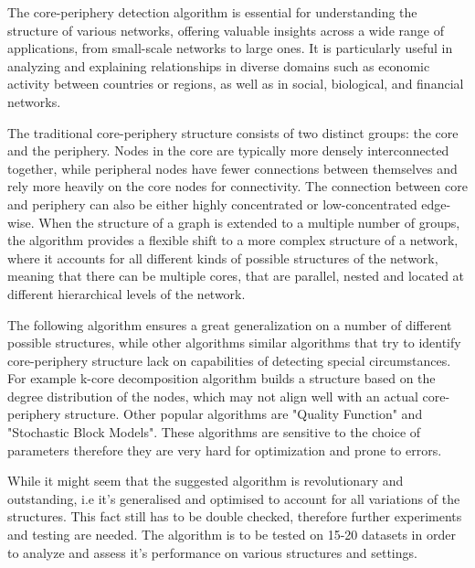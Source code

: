 \documentclass[sigconf]{acmart}
\begin{document}
The core-periphery detection algorithm is essential for understanding the structure of various networks, offering valuable insights across a wide range of applications, from small-scale networks to large ones. It is particularly useful in analyzing and explaining relationships in diverse domains such as economic activity between countries or regions, as well as in social, biological, and financial networks.

The traditional core-periphery structure consists of two distinct groups: the core and the periphery. Nodes in the core are typically more densely interconnected together, while peripheral nodes have fewer connections between themselves and rely more heavily on the core nodes for connectivity. The connection between core and periphery can also be either highly concentrated or low-concentrated edge-wise. 
When the structure of a graph is extended to a multiple number of groups, the algorithm provides a flexible shift to a more complex structure of a network, where it accounts for all different kinds of possible structures of the network, meaning that there can be multiple cores, that are parallel, nested and located at different hierarchical levels of the network.

The following algorithm ensures a great generalization on a number of different possible structures, while other algorithms similar algorithms that try to identify core-periphery structure lack on capabilities of detecting special circumstances. For example k-core decomposition algorithm builds a structure based on the degree distribution of the nodes, which may not align well with an actual core-periphery structure. Other popular algorithms are "Quality Function" and "Stochastic Block Models". These algorithms are sensitive to the choice of parameters therefore they are very hard for optimization and prone to errors. 

While it might seem that the suggested algorithm is revolutionary and outstanding, i.e it's generalised and optimised to account for all variations of the structures. This fact still has to be double checked, therefore further experiments and testing are needed. The algorithm is to be tested on 15-20  datasets in order to analyze and assess it's performance on various structures and settings. 



\end{document}
